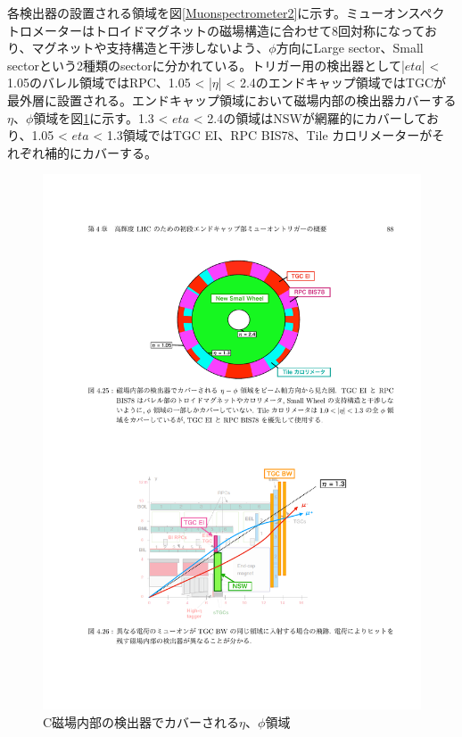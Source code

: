 各検出器の設置される領域を図\ref{Muonspectrometer2}に示す。ミューオンスペクトロメーターはトロイドマグネットの磁場構造に合わせて8回対称になっており、マグネットや支持構造と干渉しないよう、$\phi$方向にLarge sector、Small sectorという2種類のsectorに分かれている。トリガー用の検出器として|$eta$| < 1.05のバレル領域ではRPC、1.05 < |$\eta$| < 2.4のエンドキャップ領域ではTGCが最外層に設置される。エンドキャップ領域において磁場内部の検出器カバーする$\eta$、$\phi$領域を図\ref{SL_InnerCoin_covarage}に示す。1.3 < $eta$ < 2.4の領域はNSWが網羅的にカバーしており、1.05 < $eta$ < 1.3領域ではTGC EI、RPC BIS78、Tile カロリメーターがそれぞれ補的にカバーする。

\begin{figure} 
\centering
\includegraphics[width=16cm]{fig/Intro/SL_InnerCoin_covarage.pdf}
\caption[磁場内部の検出器でカバーされる$\eta$、$\phi$領域]{C磁場内部の検出器でカバーされる$\eta$、$\phi$領域\cite{mt_mino}}
\label{SL_InnerCoin_covarage}
\end{figure}

